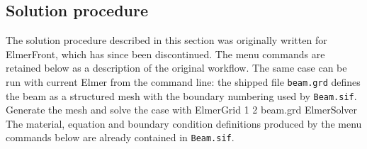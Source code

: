 \subsection*{Solution procedure}

The solution procedure described in this section was originally written for
ElmerFront, which has since been discontinued. The menu commands are retained
below as a description of the original workflow. The same case can be run with
current Elmer from the command line: the shipped file \texttt{beam.grd} defines
the beam as a structured mesh with the boundary numbering used by
\texttt{Beam.sif}. Generate the mesh and solve the case with
\ttbegin
ElmerGrid 1 2 beam.grd
ElmerSolver
\ttend
The material, equation and boundary condition definitions produced by the menu
commands below are already contained in \texttt{Beam.sif}.


